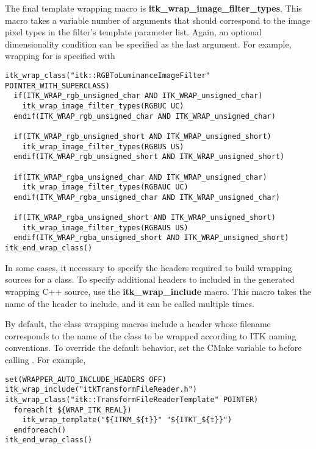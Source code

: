 The final template wrapping macro is \textbf{itk\_wrap\_image\_filter\_types}.
This macro takes a variable number of arguments that should correspond to the
image pixel types in the filter's template parameter list. Again, an optional
dimensionality condition can be specified as the last argument. For example,
wrapping for  is specified with

\begin{verbatim}
itk_wrap_class("itk::RGBToLuminanceImageFilter" POINTER_WITH_SUPERCLASS)
  if(ITK_WRAP_rgb_unsigned_char AND ITK_WRAP_unsigned_char)
    itk_wrap_image_filter_types(RGBUC UC)
  endif(ITK_WRAP_rgb_unsigned_char AND ITK_WRAP_unsigned_char)

  if(ITK_WRAP_rgb_unsigned_short AND ITK_WRAP_unsigned_short)
    itk_wrap_image_filter_types(RGBUS US)
  endif(ITK_WRAP_rgb_unsigned_short AND ITK_WRAP_unsigned_short)

  if(ITK_WRAP_rgba_unsigned_char AND ITK_WRAP_unsigned_char)
    itk_wrap_image_filter_types(RGBAUC UC)
  endif(ITK_WRAP_rgba_unsigned_char AND ITK_WRAP_unsigned_char)

  if(ITK_WRAP_rgba_unsigned_short AND ITK_WRAP_unsigned_short)
    itk_wrap_image_filter_types(RGBAUS US)
  endif(ITK_WRAP_rgba_unsigned_short AND ITK_WRAP_unsigned_short)
itk_end_wrap_class()
\end{verbatim}

In some cases, it necessary to specify the headers required to build wrapping
sources for a class. To specify additional headers to included in the generated
wrapping C++ source, use the \textbf{itk\_wrap\_include} macro. This macro takes the
name of the header to include, and it can be called multiple times.

By default, the class wrapping macros include a header whose filename
corresponds to the name of the class to be wrapped according to ITK naming
conventions. To override the default behavior, set the CMake variable
 to  before calling
. For example,

\begin{verbatim}
set(WRAPPER_AUTO_INCLUDE_HEADERS OFF)
itk_wrap_include("itkTransformFileReader.h")
itk_wrap_class("itk::TransformFileReaderTemplate" POINTER)
  foreach(t ${WRAP_ITK_REAL})
    itk_wrap_template("${ITKM_${t}}" "${ITKT_${t}}")
  endforeach()
itk_end_wrap_class()
\end{verbatim}

